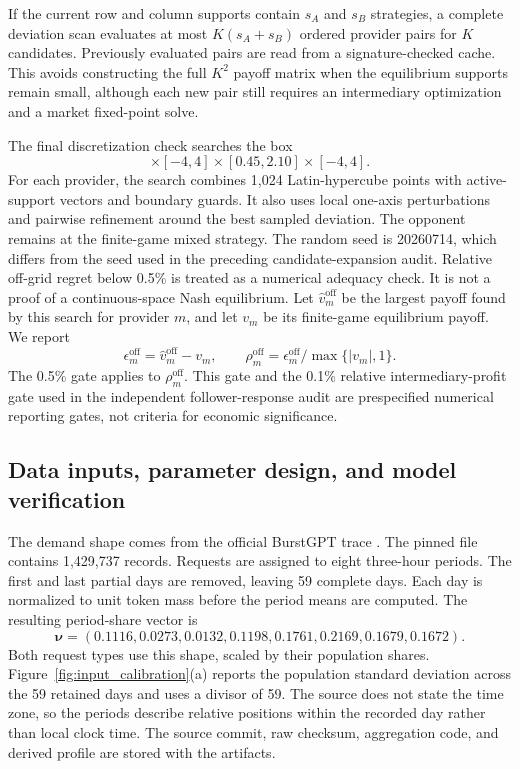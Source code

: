 \documentclass[11pt,a4paper]{article}
\begin{document}
If the current row and column supports contain $s_A$ and $s_B$ strategies, a complete deviation scan evaluates at most $K(s_A+s_B)$ ordered provider pairs for $K$ candidates. Previously evaluated pairs are read from a signature-checked cache. This avoids constructing the full $K^2$ payoff matrix when the equilibrium supports remain small, although each new pair still requires an intermediary optimization and a market fixed-point solve.

The final discretization check searches the box
\begin{equation}
[0.25,0.90]\times[-4,4]\times[0.45,2.10]\times[-4,4].
\label{eq:offgrid_box}
\end{equation}
For each provider, the search combines 1,024 Latin-hypercube points \cite{mckay1979comparison} with active-support vectors and boundary guards. It also uses local one-axis perturbations and pairwise refinement around the best sampled deviation. The opponent remains at the finite-game mixed strategy. The random seed is 20260714, which differs from the seed used in the preceding candidate-expansion audit. Relative off-grid regret below 0.5\% is treated as a numerical adequacy check. It is not a proof of a continuous-space Nash equilibrium.
Let $\widehat v_m^{\mathrm{off}}$ be the largest payoff found by this search for provider $m$, and let $v_m$ be its finite-game equilibrium payoff. We report
\begin{equation}
\epsilon_m^{\mathrm{off}}=\widehat v_m^{\mathrm{off}}-v_m,
\qquad
\rho_m^{\mathrm{off}}=\epsilon_m^{\mathrm{off}}/\max\{|v_m|,1\}.
\label{eq:offgrid_regret}
\end{equation}
The 0.5\% gate applies to $\rho_m^{\mathrm{off}}$. This gate and the 0.1\% relative intermediary-profit gate used in the independent follower-response audit are prespecified numerical reporting gates, not criteria for economic significance.

\subsection{Data inputs, parameter design, and model verification}

The demand shape comes from the official BurstGPT trace \cite{wang2025burstgpt}. The pinned file contains 1,429,737 records. Requests are assigned to eight three-hour periods. The first and last partial days are removed, leaving 59 complete days. Each day is normalized to unit token mass before the period means are computed. The resulting period-share vector is
\[
\boldsymbol\nu=(0.1116,0.0273,0.0132,0.1198,0.1761,0.2169,0.1679,0.1672).
\]
Both request types use this shape, scaled by their population shares. Figure~\ref{fig:input_calibration}(a) reports the population standard deviation across the 59 retained days and uses a divisor of 59. The source does not state the time zone, so the periods describe relative positions within the recorded day rather than local clock time. The source commit, raw checksum, aggregation code, and derived profile are stored with the artifacts.
\end{document}
